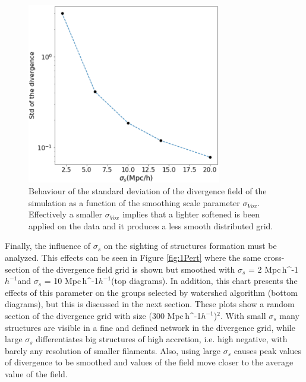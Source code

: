 \documentclass[usenatbib]{mnras}
\newcommand{\Mpch}{\,{\rm Mpc}\,\ifmmode h^{-1}\else $h^{-1}$\fi}
\begin{document}
\begin{figure}
    \centering
    \includegraphics[width=240pt]{std_smooth.pdf}
    \caption{Behaviour of the standard deviation of the divergence field of
      the simulation as a function of the smoothing scale parameter
      $\sigma_{Vox}$. Effectively a smaller $\sigma_{Vox}$ implies that a lighter softened is been applied
      on the data and it produces a less smooth distributed grid.} 
    \label{fig:std_smooth}
\end{figure}


Finally, the influence of $\sigma_s$ on the sighting of structures formation must be analyzed. This effects can be seen in Figure \ref{fig:1Pert} where the same cross-section of the divergence field grid is shown but smoothed with $\sigma_s$ = 2\,\Mpch and $\sigma_s$ = 10\,\Mpch (top diagrams). In addition, this chart presents the effects of this parameter on the groups selected by watershed algorithm (bottom diagrams), but this is discussed in the next section. These plots show a random section of the divergence grid with size (300\,\Mpch)$^2$. With small $\sigma_{s}$ many structures are visible in a fine and defined network in the divergence grid, while large $\sigma_{s}$ differentiates big structures of high accretion, i.e. high negative, with barely any resolution of smaller filaments. Also, using large $\sigma_{s}$ causes peak values of divergence to be smoothed and values of the field move closer to  the average value of the field. 
\end{document}
